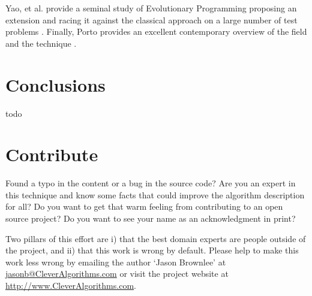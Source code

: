 \documentclass[a4paper, 11pt]{article}
\makeatletter
\newcommand{\myreportauthor}{Jason Brownlee}
\newcommand{\myreportemail}{jasonb@CleverAlgorithms.com}
\newcommand{\myreportwebsite}{http://www.CleverAlgorithms.com}
\makeatother
\begin{document}
Yao, et al. provide a seminal study of Evolutionary Programming proposing an extension and racing it against the classical approach on a large number of test problems \cite{Yao1999}. Finally, Porto provides an excellent contemporary overview of the field and the technique \cite{Porto2000}.

% 
% 
\section{Conclusions}
\label{sec:conclusions}
todo

% 
% 
\section{Contribute}
\label{sec:contribute}
Found a typo in the content or a bug in the source code? 
Are you an expert in this technique and know some facts that could improve the algorithm description for all?
Do you want to get that warm feeling from contributing to an open source project? 
Do you want to see your name as an acknowledgment in print?

Two pillars of this effort are i) that the best domain experts are people outside of the project, and ii) that this work is wrong by default. 
Please help to make this work less wrong by emailing the author `\myreportauthor' at \url{\myreportemail} or visit the project website at \url{\myreportwebsite}.



\end{document}
